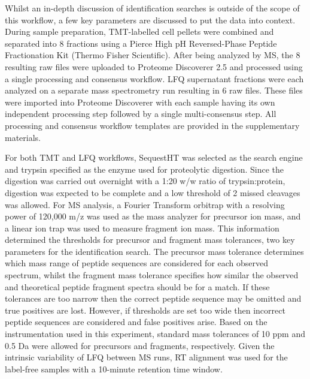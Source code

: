 \documentclass[9pt,a4paper,]{extarticle}
\begin{document}
Whilst an in-depth discussion of identification searches is outside of the scope
of this workflow, a few key parameters are discussed to put the data into
context. During sample preparation, TMT-labelled cell pellets were combined and
separated into 8 fractions using a Pierce High pH Reversed-Phase Peptide
Fractionation Kit (Thermo Fisher Scientific). After being analyzed by MS, the 8
resulting raw files were uploaded to Proteome Discoverer 2.5 and processed using
a single processing and consensus workflow. LFQ supernatant fractions were each
analyzed on a separate mass spectrometry run resulting in 6 raw files. These
files were imported into Proteome Discoverer with each sample having its own
independent processing step followed by a single multi-consensus step. All
processing and consensus workflow templates are provided in the supplementary
materials.

For both TMT and LFQ workflows, SequestHT was selected as the search engine and
trypsin specified as the enzyme used for proteolytic digestion. Since the
digestion was carried out overnight with a 1:20 w/w ratio of trypsin:protein,
digestion was expected to be complete and a low threshold of 2 missed cleavages
was allowed. For MS analysis, a Fourier Transform orbitrap with a resolving
power of 120,000 m/z was used as the mass analyzer for precursor ion mass, and a
linear ion trap was used to measure fragment ion mass. This information
determined the thresholds for precursor and fragment mass tolerances, two key
parameters for the identification search. The precursor mass tolerance
determines which mass range of peptide sequences are considered for each
observed spectrum, whilst the fragment mass tolerance specifies how similar the
observed and theoretical peptide fragment spectra should be for a match. If
these tolerances are too narrow then the correct peptide sequence may be omitted
and true positives are lost. However, if thresholds are set too wide then
incorrect peptide sequences are considered and false positives arise. Based on
the instrumentation used in this experiment, standard mass tolerances of 10 ppm
and 0.5 Da were allowed for precursors and fragments, respectively. Given the
intrinsic variability of LFQ between MS runs, RT alignment was used for the
label-free samples with a 10-minute retention time window.
\end{document}
